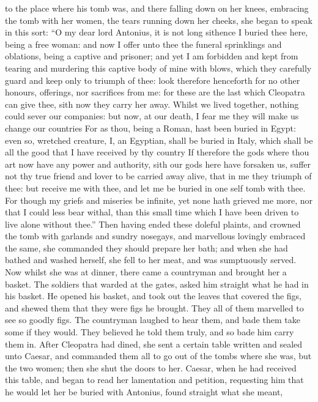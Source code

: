 \documentclass{book}
\begin{document}
to the place where his tomb was, and there falling down on her knees,
embracing the tomb with her women, the tears running down her cheeks,
she began to speak
in this sort: ``O my dear lord Antonius, it is not
long sithence I buried thee here, being a free woman: and now I offer
unto thee the funeral sprinklings and oblations, being a captive and
prisoner; and yet I am forbidden and kept from tearing and murdering
this captive body of mine with blows, which they carefully guard and
keep only to triumph of thee: look therefore henceforth for no other
honours, offerings, nor sacrifices from me: for these are the last
which Cleopatra can give thee, sith now they carry her away. Whilst
we lived together, nothing could sever our companies: but now, at our
death, I fear me they will make us change our countries For as thou,
being a Roman, hast been buried in Egypt: even so, wretched creature,
I, an Egyptian, shall be buried in Italy, which shall be all the good
that I have received by thy country If therefore the gods where thou
art now have any power and authority, sith our gods here have forsaken
us, suffer not thy true friend and lover to be carried away alive,
that in me they triumph of thee: but receive me with thee, and let
me be buried in one self tomb with thee. For though my griefs and
miseries be infinite, yet none hath grieved me more, nor that I could
less bear withal, than this small time which I have been driven to
live alone without thee.''
Then having ended these doleful plaints, and crowned the tomb with
garlands and sundry nosegays, and marvellous lovingly embraced the same, she
commanded they should prepare her bath; and when she had bathed and washed
herself, she fell to her meat, and was sumptuously served. Now whilst she was
at dinner, there came a countryman and brought her a basket. The soldiers that
warded at the gates, asked him straight what he had in his basket. He
opened his basket, and took out the leaves that covered the figs, and shewed
them that they were figs he brought. They all of them marvelled to see so
goodly figs. The countryman laughed to hear them, and bade them take some if
they would. They believed he told them truly, and so bade him carry them in.
After Cleopatra had dined, she sent a certain table written and sealed
unto Caesar, and commanded them all to go out of the tombs where she was, but
the two women; then she shut the doors to her. Caesar, when he had received
this table, and began to read her lamentation and petition, requesting him
that he would let her be buried with Antonius, found straight what she meant,
\end{document}
